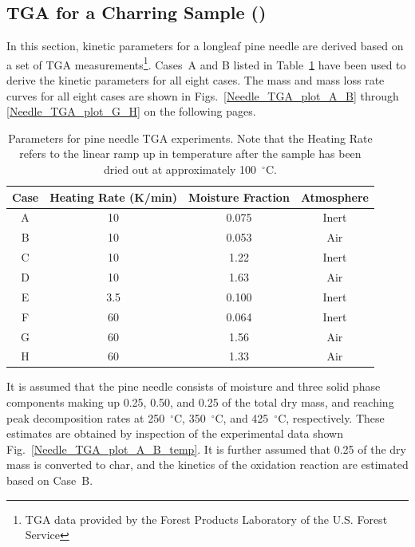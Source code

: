 \documentclass[11pt]{book}
\begin{document}
\subsection{TGA for a Charring Sample (\texorpdfstring{}{Needle\_TGA})}
\label{Needle_TGA}

In this section, kinetic parameters for a longleaf pine needle are derived based on a set of TGA measurements\footnote{TGA data provided by the Forest Products Laboratory of the U.S. Forest Service}. Cases~A and B listed in Table~\ref{Needle_TGA_table} have been used to derive the kinetic parameters for all eight cases. The mass and mass loss rate curves for all eight cases are shown in Figs.~\ref{Needle_TGA_plot_A_B} through \ref{Needle_TGA_plot_G_H} on the following pages.

\begin{table}[!ht]
\centering
\caption[Parameters for pine needle TGA experiments]{Parameters for pine needle TGA experiments. Note that the Heating Rate refers to the linear ramp up in temperature after the sample has been dried out at approximately 100~$^\circ$C.}
\label{Needle_TGA_table}
\begin{tabular}{|c|c|c|c|}
\hline
Case & Heating Rate (K/min)  & Moisture Fraction & Atmosphere \\ \hline
A    & 10                    & 0.075             & Inert      \\
B    & 10                    & 0.053             & Air        \\
C    & 10                    & 1.22              & Inert      \\
D    & 10                    & 1.63              & Air        \\
E    & 3.5                   & 0.100             & Inert      \\
F    & 60                    & 0.064             & Inert      \\
G    & 60                    & 1.56              & Air        \\
H    & 60                    & 1.33              & Air        \\ \hline
\end{tabular}
\end{table}

It is assumed that the pine needle consists of moisture and three solid phase components making up 0.25, 0.50, and 0.25 of the total dry mass, and reaching peak decomposition rates at 250~$^\circ$C, 350~$^\circ$C, and 425~$^\circ$C, respectively. These estimates are obtained by inspection of the experimental data shown Fig.~\ref{Needle_TGA_plot_A_B_temp}. It is further assumed that 0.25 of the dry mass is converted to char, and the kinetics of the oxidation reaction are estimated based on Case~B.
\end{document}
